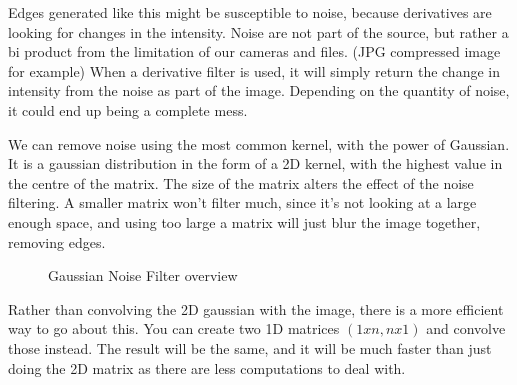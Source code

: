 Edges generated like this might be susceptible to noise, because derivatives are looking for changes in the intensity. Noise are not part of the source, but rather a bi product from the limitation of our cameras and files. (JPG compressed image for example) When a derivative filter is used, it will simply return the change in intensity from the noise as part of the image. Depending on the quantity of noise, it could end up being a complete mess.

We can remove noise using the most common kernel, with the power of Gaussian. It is a gaussian distribution in the form of a 2D kernel, with the highest value in the centre of the matrix. The size of the matrix alters the effect of the noise filtering. A smaller matrix won't filter much, since it's not looking at a large enough space, and using too large a matrix will just blur the image together, removing edges.
\begin{figure}[!htb]
	\caption{\label{fig:noiseMat}Gaussian Noise Filter overview}
\end{figure}

Rather than convolving the 2D gaussian with the image, there is a more efficient way to go about this. You can create two 1D matrices $(1xn, nx1)$ and convolve those instead. The result will be the same, and it will be much faster than just doing the 2D matrix as there are less computations to deal with.

